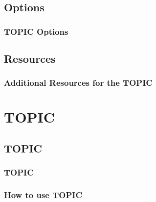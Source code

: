 \documentclass{beamer}
\begin{document}
\subsection{Options}		
\begin{frame}
	\frametitle{TOPIC Options}
	\begin{outline}
		\1 
	\end{outline}
\end{frame}

\subsection{Resources}		
\begin{frame}
	\frametitle{Additional Resources for the TOPIC}
	\begin{outline}
		\1 
		\2 
		\2
	\end{outline}
\end{frame}

		
\section{TOPIC}

\subsection{TOPIC}		

\begin{frame}
	\frametitle{TOPIC}
	\begin{outline}
		\1 
	\end{outline}
\end{frame}

\begin{frame}
	\frametitle{How to use TOPIC}
	\begin{outline}
		\1 
	\end{outline}
\end{frame}
\end{document}
